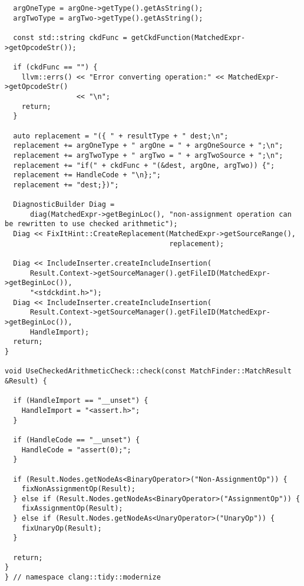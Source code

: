 {\begin{verbatim}
  argOneType = argOne->getType().getAsString();
  argTwoType = argTwo->getType().getAsString();

  const std::string ckdFunc = getCkdFunction(MatchedExpr->getOpcodeStr());

  if (ckdFunc == "") {
    llvm::errs() << "Error converting operation:" << MatchedExpr->getOpcodeStr()
                 << "\n";
    return;
  }

  auto replacement = "({ " + resultType + " dest;\n";
  replacement += argOneType + " argOne = " + argOneSource + ";\n";
  replacement += argTwoType + " argTwo = " + argTwoSource + ";\n";
  replacement += "if(" + ckdFunc + "(&dest, argOne, argTwo)) {";
  replacement += HandleCode + "\n};";
  replacement += "dest;})";

  DiagnosticBuilder Diag =
      diag(MatchedExpr->getBeginLoc(), "non-assignment operation can be rewritten to use checked arithmetic");
  Diag << FixItHint::CreateReplacement(MatchedExpr->getSourceRange(),
                                       replacement);

  Diag << IncludeInserter.createIncludeInsertion(
      Result.Context->getSourceManager().getFileID(MatchedExpr->getBeginLoc()),
      "<stdckdint.h>");
  Diag << IncludeInserter.createIncludeInsertion(
      Result.Context->getSourceManager().getFileID(MatchedExpr->getBeginLoc()),
      HandleImport);
  return;
}

void UseCheckedArithmeticCheck::check(const MatchFinder::MatchResult &Result) {

  if (HandleImport == "__unset") {
    HandleImport = "<assert.h>";
  }

  if (HandleCode == "__unset") {
    HandleCode = "assert(0);";
  }

  if (Result.Nodes.getNodeAs<BinaryOperator>("Non-AssignmentOp")) {
    fixNonAssignmentOp(Result);
  } else if (Result.Nodes.getNodeAs<BinaryOperator>("AssignmentOp")) {
    fixAssignmentOp(Result);
  } else if (Result.Nodes.getNodeAs<UnaryOperator>("UnaryOp")) {
    fixUnaryOp(Result);
  }

  return;
}
} // namespace clang::tidy::modernize

\end{verbatim}
}

